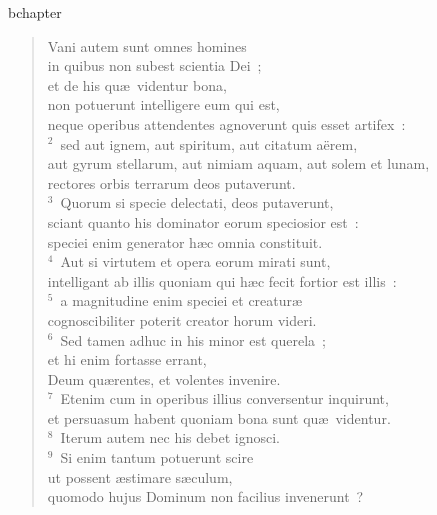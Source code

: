 bchapter\begin{flushleft}\begin{verse}\vspace{-19pt}\hspace{6pt}Vani autem sunt omnes homines\\\hspace{6pt} in quibus non subest scientia Dei~;\\ et de his qu\ae\ videntur bona,\\ non potuerunt intelligere eum qui est,\\ neque operibus attendentes agnoverunt quis esset artifex~:\\
${}^{2}$~sed aut ignem, aut spiritum, aut citatum a\"erem,\\ aut gyrum stellarum, aut nimiam aquam, aut solem et lunam,\\ rectores orbis terrarum deos putaverunt.\\
${}^{3}$~Quorum si specie delectati, deos putaverunt,\\ sciant quanto his dominator eorum speciosior est~:\\ speciei enim generator h\ae c omnia constituit.\\
${}^{4}$~Aut si virtutem et opera eorum mirati sunt,\\ intelligant ab illis quoniam qui h\ae c fecit fortior est illis~:\\
${}^{5}$~a magnitudine enim speciei et creatur\ae \\ cognoscibiliter poterit creator horum videri.\\
${}^{6}$~Sed tamen adhuc in his minor est querela~;\\ et hi enim fortasse errant,\\ Deum qu\ae rentes, et volentes invenire.\\
${}^{7}$~Etenim cum in operibus illius conversentur inquirunt,\\ et persuasum habent quoniam bona sunt qu\ae\ videntur.\\
${}^{8}$~Iterum autem nec his debet ignosci.\\
${}^{9}$~Si enim tantum potuerunt scire\\ ut possent \ae stimare s\ae culum,\\ quomodo hujus Dominum non facilius invenerunt~?\end{verse}\end{flushleft}


